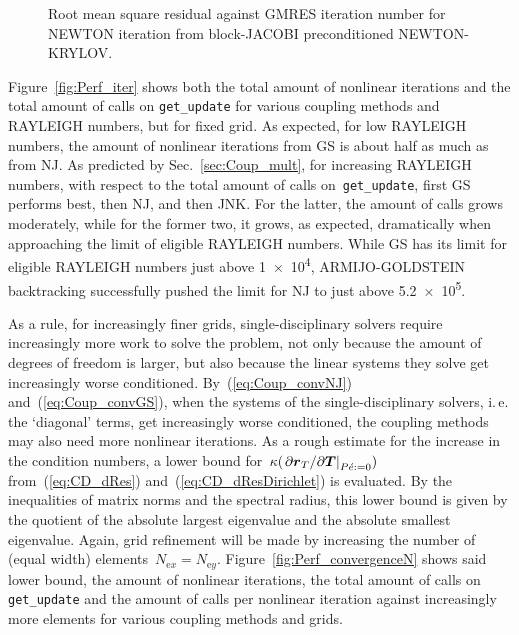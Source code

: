 \documentclass[10pt, ngerman, english,
twoside, open=right,
numbers=noenddot,
declaration=section,
abstract=section,
abstract=multiple,
abstract=notoc,
declaration=notoc,
cd=pale, 
chapterprefix=off, 
chapterpage=false, 
headingsvskip=-10em,
cdgeometry=custom, 
slantedgreek=on,
cdmath=on, 
cdfont=on,
ttfont=false,
mathswap=off,
]{tudscrreprt}
\numberwithin{equation}{chapter}
\renewcommand{\textsc}[1]{\uppercase{\mbox{#1}}}
\newcommand{\sidenote}[1]{
  \leavevmode %
  \marginpar{\hyphenpenalty=1000 \flushleft{\textcolor{HKS41}{#1}}}}
\begin{document}
\begin{figure}[!t]
\centering

\caption{Root mean square residual against GMRES iteration number for \textsc{Newton} iteration from block-\textsc{Jacobi} preconditioned \textsc{Newton}-\textsc{Krylov}.}\label{fig:Perf_convergenceGMRES}
\end{figure}
\sidenote{Computational Work}Figure~\ref{fig:Perf_iter} shows both the total amount of nonlinear iterations and the total amount of calls on \texttt{get\_update} for various coupling methods and \textsc{Rayleigh} numbers, but for fixed grid.
As expected, for low \textsc{Rayleigh} numbers, the amount of nonlinear iterations from GS is about half as much as from NJ.
As predicted by Sec.~\ref{sec:Coup_mult}, for increasing \textsc{Rayleigh} numbers, with respect to the total amount of calls on~\texttt{get\_update}, first GS performs best, then NJ, and then JNK. For the latter, the amount of calls grows moderately, while for the former two, it grows, as expected, dramatically when approaching the limit of eligible \textsc{Rayleigh} numbers. 
While GS has its limit for eligible \textsc{Rayleigh} numbers just above \num{1e4}, \textsc{Armijo}-\textsc{Goldstein} backtracking successfully pushed the limit for NJ to just above \num{5.2e5}.\par
\sidenote{Scalability}As a rule, for increasingly finer grids, single-disciplinary solvers require increasingly more work to solve the problem, not only because the amount of degrees of freedom is larger, but also because the linear systems they solve get increasingly worse conditioned.
By~(\ref{eq:Coup_convNJ}) and~(\ref{eq:Coup_convGS}), when the systems of the single-disciplinary solvers, i.\,e. the `diagonal' terms, get increasingly worse conditioned, the coupling methods may also need more nonlinear iterations.
As a rough estimate for the increase in the condition numbers, a lower bound for~$\kappa\left(\at{\partial\vec{r}_T/\partial\vec{T}}{P\acute{e}:=0}\right)$ from~(\ref{eq:CD_dRes}) and~(\ref{eq:CD_dResDirichlet}) is evaluated.
By the inequalities of matrix norms and the spectral radius, this lower bound is given by the quotient of the absolute largest eigenvalue and the absolute smallest eigenvalue. 
Again, grid refinement will be made by increasing the number of (equal width) elements~$N_{\text{e}x}=N_{\text{e}y}$. 
Figure~\ref{fig:Perf_convergenceN} shows said lower bound, the amount of nonlinear iterations, the total amount of calls on \texttt{get\_update} and the amount of calls per nonlinear iteration against increasingly more elements for various coupling methods and grids. 
\end{document}
